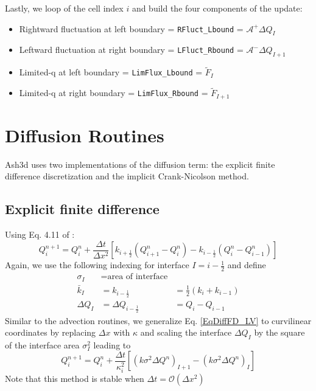 Lastly, we loop of the cell index $i$ and build the four components of the update:
\begin{itemize}
 \item Rightward fluctuation at left boundary = \texttt{RFluct\_Lbound} = $\mathcal{A}^{+} \Delta Q_I$
 \item Leftward fluctuation at right boundary = \texttt{LFluct\_Rbound} = $\mathcal{A}^{-} \Delta Q_{I+1}$
 \item Limited-q at left boundary = \texttt{LimFlux\_Lbound} = $\widetilde{F}_I$
 \item Limited-q at right boundary = \texttt{LimFlux\_Rbound} = $\widetilde{F}_{I+1} $
\end{itemize}


\section{Diffusion Routines}
Ash3d uses two implementations of the diffusion term: the explicit finite difference
discretization and the implicit Crank-Nicolson method.  

\subsection{Explicit finite difference}
Using Eq. 4.11 of \cite{LeVeque2003}:
\begin{equation}\label{EqDiffFD_LV}
Q^{n+1}_i = Q^{n}_i + \frac{\Delta t}{\Delta x^2} \left[ k_{i+\frac{1}{2}}\left( Q^{n}_{i+1}-Q^{n}_{i}\right) -
k_{i-\frac{1}{2}}\left( Q^{n}_{i}-Q^{n}_{i-1}\right) \right]
\end{equation}
Again, we use the following indexing for interface $I=i-\frac{1}{2}$ and define
\begin{align*}
\sigma_I &= \text{area of interface} &  \\
\bar{k}_I &= k_{i-\frac{1}{2}} &= \frac{1}{2}\left( k_i + k_{i-1} \right)\\
\Delta Q_I &= \Delta Q_{i-\frac{1}{2}} &= Q_i - Q_{i-1} 
\end{align*}
Similar to the advection routines, we generalize Eq. \ref{EqDiffFD_LV} to curvilinear coordinates by replacing
$\Delta x$ with $\kappa$ and scaling the interface $\Delta Q_I$ by the square of the
interface area $\sigma_I^2$ leading to
\begin{equation}\label{EqDiffFD}
Q^{n+1}_i = Q^{n}_i + \frac{\Delta t}{\kappa_i^2} \left[ 
\left( k \sigma^2 \Delta Q^n \right)_{I+1} - 
\left( k \sigma^2 \Delta Q^n \right)_I  \right]
\end{equation}
Note that this method is stable when $\Delta t = \mathcal{O}(\Delta x^2)$

